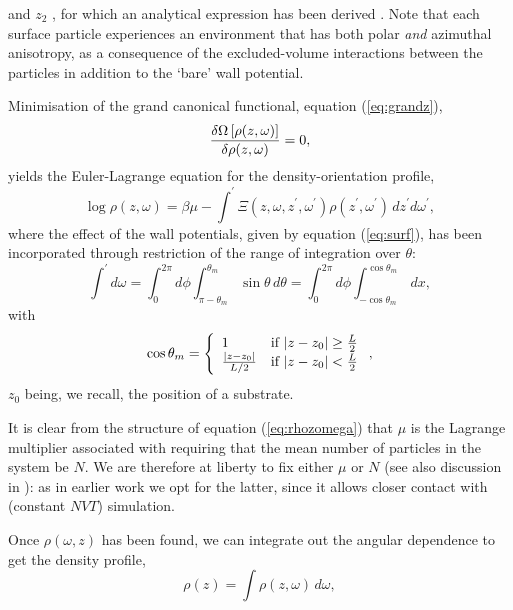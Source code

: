 \documentclass[aps,pre,twocolumn,groupedaddress,showpacs]{revtex4}
\begin{document}
and $z_2$ \cite{Poniewierski:1993}, for which an analytical expression has 
been derived \cite{Kike:1998}. Note that each surface particle experiences 
an environment that has both polar {\it and} azimuthal anisotropy, as a 
consequence of the excluded-volume interactions between the particles in 
addition to the `bare' wall potential.
\par
Minimisation of the grand canonical functional, equation (\ref{eq:grandz}),
\begin{equation}
\label{eq:domegadrho}
{{\delta \Omega\left[\rho(z,\omega)\right]}\over
{\delta\rho(z,\omega)}}=0,
\end{equation}
yields the Euler-Lagrange equation for the density-orientation profile,
\begin{equation}
\label{eq:rhozomega}
\log\rho(z,\omega)=\beta\mu - \int^{\prime} 
\Xi(z,\omega,z^{\prime},\omega^{\prime})
\rho(z^{\prime},\omega^{\prime})\,dz^{\prime}d\omega^{\prime},
\end{equation}
where the effect of the wall potentials, given by equation
(\ref{eq:surf}), has been incorporated through restriction of the 
range of integration over $\theta$:
\begin{equation}
\label{eq:angint}
\int^{\prime}d\omega = \int_0^{2\pi}d\phi \int^{\theta_m}_{\pi-\theta_m} 
\sin\theta\,d\theta = \int_0^{2\pi}d\phi
\int^{\cos\theta_m}_{-\cos\theta_m}\,dx,
\end{equation}
with 
\begin{equation}
\cos\theta_{m}= \left\{ \begin{array}{ll}
1 & \mbox{if $|z-z_0| \ge {L\over 2}$} \\
{{|z-z_0|}\over{L/2}} & \mbox{if $|z-z_0| < {L\over 2}$} 
\end{array} \right. ,
\end{equation}
$z_0$ being, we recall, the position of a substrate.
\par
It is clear from the structure of equation (\ref{eq:rhozomega}) that $\mu$
is the Lagrange multiplier associated with requiring that the mean number
of particles in the system be $N$. We are therefore at liberty to fix 
either $\mu$ or $N$ (see also discussion in \cite{Allen:1999}): as in 
earlier work we opt for the latter, since it allows closer contact with 
(constant $NVT$) simulation.
\par
Once $\rho(\omega,z)$ has been found, we can integrate out the angular
dependence to get the density profile,
\begin{equation}
\label{eq:rhoz}
\rho(z)=\int \rho(z,\omega)\,d\omega,
\end{equation}
\end{document}
